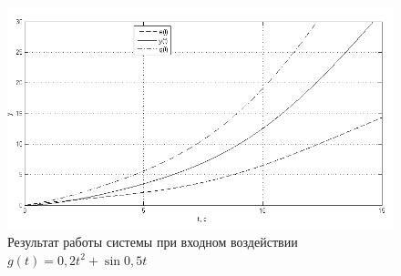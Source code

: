 \documentclass[a4paper, 11pt, russian]{article}
\begin{document}
    \begin{figure}[h!]
        \centering
        \includegraphics[scale = 0.75]{customInput.png}
        \caption{Результат работы системы при входном воздействии $g(t) = 0,2t^2 + \sin{0,5t}$}
    \end{figure}
    \vspace{2cm}
\end{document}
